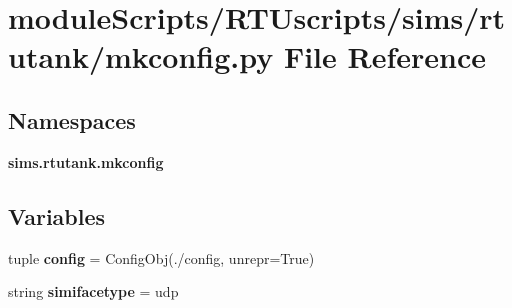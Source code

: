 \section{module\+Scripts/\+R\+T\+Uscripts/sims/rtutank/mkconfig.py File Reference}
\label{rtutank_2mkconfig_8py}
\subsection*{Namespaces}
\begin{DoxyCompactItemize}
\item 
 {\bf sims.\+rtutank.\+mkconfig}
\end{DoxyCompactItemize}
\subsection*{Variables}
\begin{DoxyCompactItemize}
\item 
tuple {\bf config} = Config\+Obj(\textquotesingle{}./config\textquotesingle{}, unrepr=True)
\item 
string {\bf simifacetype} = \textquotesingle{}udp\textquotesingle{}
\end{DoxyCompactItemize}
